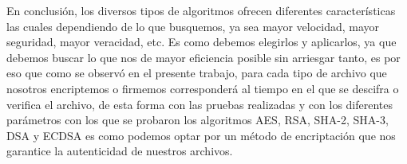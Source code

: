 \documentclass[onecolumn]{IEEEtran}
\begin{document}
En conclusión, los diversos tipos de algoritmos ofrecen diferentes características las cuales dependiendo de lo que busquemos, ya sea mayor velocidad, mayor seguridad, mayor veracidad, etc. Es como debemos elegirlos y aplicarlos, ya que debemos buscar lo que nos de mayor eficiencia posible sin arriesgar tanto, es por eso que como se observó en el presente trabajo, para cada tipo de archivo que nosotros encriptemos o firmemos corresponderá al tiempo en el que se descifra o verifica el archivo, de esta forma con las pruebas realizadas y con los diferentes parámetros con los que se probaron los algoritmos AES, RSA, SHA-2, SHA-3, DSA y ECDSA es como podemos optar por un método de encriptación que nos garantice la autenticidad de nuestros archivos.


\nocite{*}

\newpage{}

\listoffigures{}
\listoftables{}
\listoflistings{}

\printbibliography{}
\end{document}
